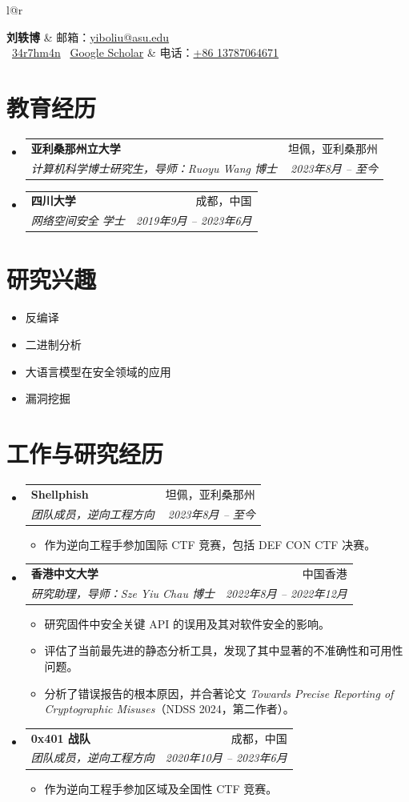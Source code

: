 \documentclass[letterpaper,11pt]{article}
\makeatletter
\newcommand{\resumeItem}[1]{
  \item\small{
    {#1 \vspace{-2pt}}
  }
}
\newcommand{\resumeSubheading}[4]{
  \vspace{-1pt}\item
    \begin{tabular*}{0.97\textwidth}[t]{l@{\extracolsep{\fill}}r}
      \textbf{#1} & #2 \\
      \textit{\small#3} & \textit{\small #4} \\
    \end{tabular*}\vspace{-5pt}
}
\newcommand{\resumeSubHeadingListStart}{\begin{itemize}[leftmargin=*]}
\newcommand{\resumeSubHeadingListEnd}{\end{itemize}}
\newcommand{\resumeItemListStart}{\begin{itemize}}
\newcommand{\resumeItemListEnd}{\end{itemize}\vspace{-5pt}}
\makeatother
\begin{document}
\begin{tabular*}{\textwidth}{l@{\extracolsep{\fill}}r}

  {\Large \textbf{刘轶博}}
  & 邮箱：\href{mailto:yiboliu@asu.edu}{yiboliu@asu.edu} \\

  \small
  \faGithub\ \href{https://github.com/bluesadi}{34r7hm4n}
  \quad
  \faGraduationCap\ \href{https://scholar.google.com/citations?user=Ckof_x4AAAAJ&hl=en}{Google Scholar}
  & \small 电话：\href{tel:+8613787064671}{+86 13787064671} \\

\end{tabular*}


\section{教育经历}
  \resumeSubHeadingListStart
    \resumeSubheading
      {亚利桑那州立大学}{坦佩，亚利桑那州}
      {计算机科学博士研究生，导师：Ruoyu Wang 博士}{2023年8月 -- 至今}
    \resumeSubheading
      {四川大学}{成都，中国}
      {网络空间安全 学士}{2019年9月 -- 2023年6月}
  \resumeSubHeadingListEnd

\section{研究兴趣}
 \resumeSubHeadingListStart
   \resumeItem{反编译\vspace{-4pt}}
   \resumeItem{二进制分析\vspace{-4pt}}
   \resumeItem{大语言模型在安全领域的应用\vspace{-4pt}}
   \resumeItem{漏洞挖掘\vspace{-4pt}}
 \resumeSubHeadingListEnd

\section{工作与研究经历}
 \resumeSubHeadingListStart
\resumeSubheading
  {Shellphish}{坦佩，亚利桑那州}
  {团队成员，逆向工程方向}{2023年8月 -- 至今}
    \resumeItemListStart
      \resumeItem{作为逆向工程手参加国际 CTF 竞赛，包括 DEF CON CTF 决赛。}
    \resumeItemListEnd
\resumeSubheading
  {香港中文大学}{中国香港}
  {研究助理，导师：Sze Yiu Chau 博士}{2022年8月 -- 2022年12月}
  \resumeItemListStart
    \resumeItem{研究固件中安全关键 API 的误用及其对软件安全的影响。}
    \resumeItem{评估了当前最先进的静态分析工具，发现了其中显著的不准确性和可用性问题。}
    \resumeItem{分析了错误报告的根本原因，并合著论文 \textit{Towards Precise Reporting of Cryptographic Misuses}（NDSS 2024，第二作者）。}
  \resumeItemListEnd
 \resumeSubheading
      {0x401 战队}{成都，中国}
      {团队成员，逆向工程方向}{2020年10月 -- 2023年6月}
      \resumeItemListStart
        \resumeItem{作为逆向工程手参加区域及全国性 CTF 竞赛。}
      \resumeItemListEnd
  \resumeSubHeadingListEnd
\end{document}
